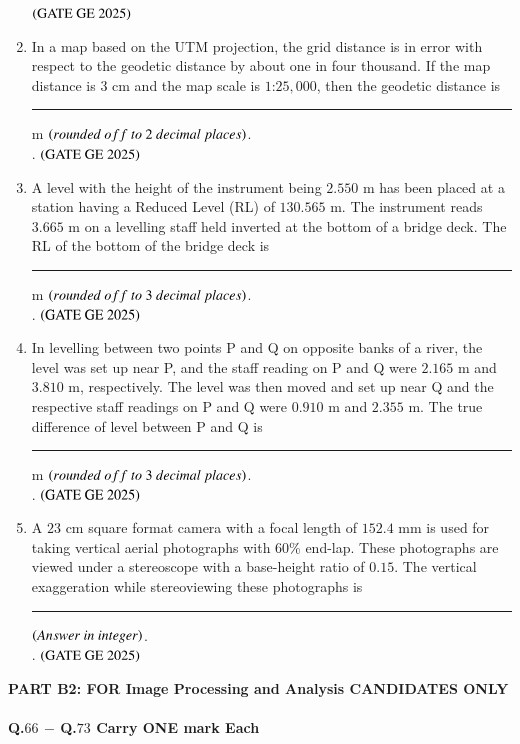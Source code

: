 \documentclass[journal,12pt,onecolumn]{IEEEtran}
\theoremstyle{remark}
\begin{document}
\begin{enumerate}
\hfill $\left(\text{GATE GE 2025}\right)$
\bigskip
\item In a map based on the UTM projection, the grid distance is in error with respect to the geodetic distance by about one in four thousand. If the map distance is $3$ cm and the map scale is $1$:$25,000$, then the geodetic distance is \rule{2cm}{0.5mm} m $\brak{rounded\ off\ to\ 2\ decimal\ places}$.\\.
\hfill $\left(\text{GATE GE 2025}\right)$
\bigskip
\item A level with the height of the instrument being $2.550$ m has been placed at a station having a Reduced Level (RL) of $130.565$ m. The instrument reads $3.665$ m on a levelling staff held inverted at the bottom of a bridge deck. The RL of the bottom of the bridge deck is \rule{2cm}{0.5mm} m $\brak{rounded\ off\ to\ 3\ decimal\ places}$.\\.
\hfill $\left(\text{GATE GE 2025}\right)$
\bigskip
\item In levelling between two points P and Q on opposite banks of a river, the level was set up near P, and the staff reading on P and Q were $2.165$ m and $3.810$ m, respectively. The level was then moved and set up near Q and the respective staff readings on P and Q were $0.910$ m and $2.355$ m. The true difference of level between P and Q is \rule{2cm}{0.5mm} m $\brak{rounded\ off\ to\ 3\ decimal\ places}$.\\.
\hfill $\left(\text{GATE GE 2025}\right)$
\bigskip
\item A $23$ cm square format camera with a focal length of $152.4$ mm is used for taking vertical aerial photographs with $60$\% end-lap. These photographs are viewed under a stereoscope with a base-height ratio of $0.15$. The vertical exaggeration while stereoviewing these photographs is \rule{2cm}{0.5mm} $\left(Answer\ in\ integer\right)$.\\.
\hfill $\left(\text{GATE GE 2025}\right)$
\bigskip
\end{enumerate}
\textbf{PART B2: FOR Image Processing and Analysis CANDIDATES ONLY}\\
\\
\textbf{Q.$66$ $-$ Q.$73$ Carry ONE mark Each}\\
\end{document}
